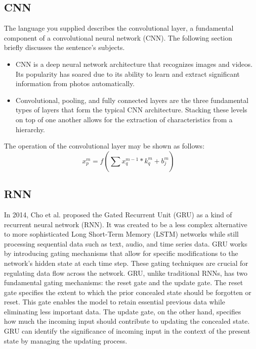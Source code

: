 \documentclass[a4paper,fleqn]{cas-sc}
\begin{document}
\subsection{CNN}
The language you supplied describes the convolutional layer, a fundamental component of a convolutional neural
network (CNN). The following section briefly discusses the sentence’s subjects.\\
\begin{itemize}
  \item CNN is a deep neural network architecture that recognizes images and videos. Its popularity has soared due to
  its ability to learn and extract significant information from photos automatically.
  \item Convolutional, pooling, and fully connected layers are the three fundamental types of layers that form the typical CNN architecture. Stacking these levels on top of one another allows for the extraction of characteristics from a hierarchy.\cite{}
\end{itemize}
The operation of the convolutional layer may be shown as follows:
\begin{equation}
x^{m}_p = f(\sum_{}^{}x^{m-1}_q*k^{m}_q+b^{m}_j)
\end{equation}

\subsection{RNN}
In 2014, Cho et al. proposed the Gated Recurrent Unit (GRU) as a kind of recurrent neural network (RNN). It was created to be a less complex alternative to more sophisticated Long Short-Term Memory (LSTM) networks while still processing sequential data such as text, audio, and time series data. GRU works by introducing gating mechanisms that allow for specific modifications to the network’s hidden state at each time step. These gating techniques are crucial for regulating data flow across the network. GRU, unlike traditional RNNs, has two fundamental gating mechanisms: the reset gate and the update gate. The reset gate specifies the extent
to which the prior concealed state should be forgotten or reset. This gate enables the model to retain essential previous data while eliminating less important data. The update gate, on the other hand, specifies how much the incoming input should contribute to updating the concealed state. GRU can identify the significance of incoming input in the context of the present state by managing the updating process.\cite{}
\end{document}
